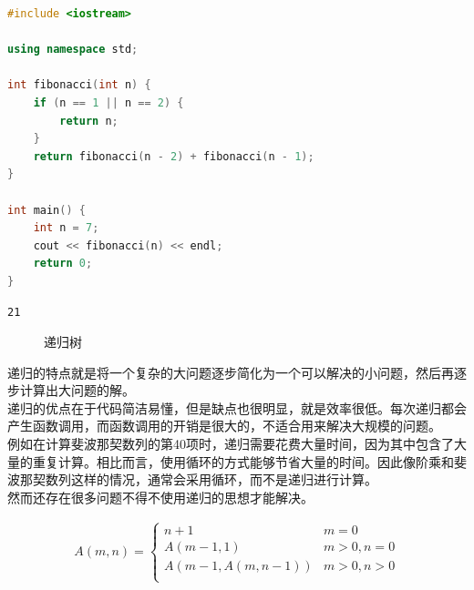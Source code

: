 \vspace{0.5cm}


\begin{lstlisting}[language=C++]
#include <iostream>

using namespace std;

int fibonacci(int n) {
	if (n == 1 || n == 2) {
		return n;
	}
	return fibonacci(n - 2) + fibonacci(n - 1);
}

int main() {
	int n = 7;
	cout << fibonacci(n) << endl;
	return 0;
}
\end{lstlisting}

\begin{tcolorbox}
	\begin{verbatim}
21
	\end{verbatim}
\end{tcolorbox}

\begin{figure}[H]
	\centering
	\caption{递归树}
\end{figure}

递归的特点就是将一个复杂的大问题逐步简化为一个可以解决的小问题，然后再逐步计算出大问题的解。\\

递归的优点在于代码简洁易懂，但是缺点也很明显，就是效率很低。每次递归都会产生函数调用，而函数调用的开销是很大的，不适合用来解决大规模的问题。\\

例如在计算斐波那契数列的第40项时，递归需要花费大量时间，因为其中包含了大量的重复计算。相比而言，使用循环的方式能够节省大量的时间。因此像阶乘和斐波那契数列这样的情况，通常会采用循环，而不是递归进行计算。\\

然而还存在很多问题不得不使用递归的思想才能解决。\\


\begin{align}\nonumber
	A(m, n) =
	\begin{cases}
		n + 1             & m = 0        \\
		A(m-1, 1)         & m > 0, n = 0 \\
		A(m-1, A(m, n-1)) & m > 0, n > 0 \\
	\end{cases}
\end{align}

